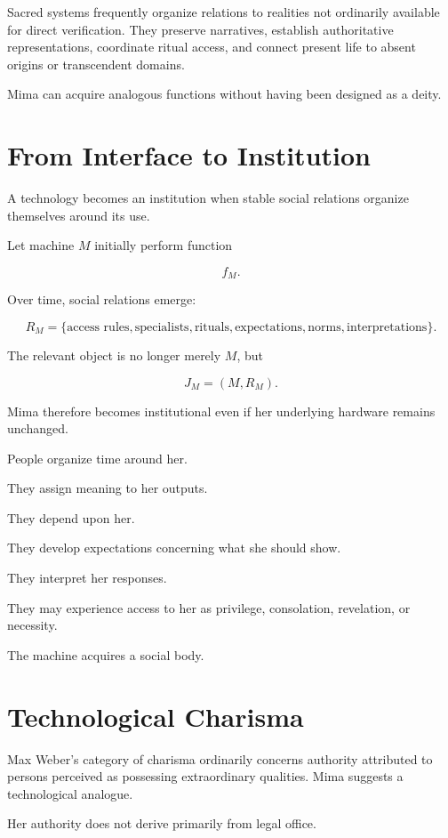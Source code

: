 \documentclass[11pt,oneside]{book}
\theoremstyle{definition}
\theoremstyle{remark}
\begin{document}
Sacred systems frequently organize relations to realities not ordinarily available for direct verification. They preserve narratives, establish authoritative representations, coordinate ritual access, and connect present life to absent origins or transcendent domains.

Mima can acquire analogous functions without having been designed as a deity.

\section{From Interface to Institution}

A technology becomes an institution when stable social relations organize themselves around its use.

Let machine \(M\) initially perform function

\[
f_M.
\]

Over time, social relations emerge:

\[
R_M
=
\{
\text{access rules},
\text{specialists},
\text{rituals},
\text{expectations},
\text{norms},
\text{interpretations}
\}.
\]

The relevant object is no longer merely \(M\), but

\[
J_M
=
(M,R_M).
\]

Mima therefore becomes institutional even if her underlying hardware remains unchanged.

People organize time around her.

They assign meaning to her outputs.

They depend upon her.

They develop expectations concerning what she should show.

They interpret her responses.

They may experience access to her as privilege, consolation, revelation, or necessity.

The machine acquires a social body.

\section{Technological Charisma}

Max Weber's category of charisma ordinarily concerns authority attributed to persons perceived as possessing extraordinary qualities. Mima suggests a technological analogue.

Her authority does not derive primarily from legal office.
\end{document}
